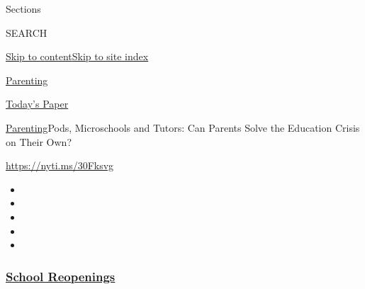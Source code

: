 Sections

SEARCH

\protect\hyperlink{site-content}{Skip to
content}\protect\hyperlink{site-index}{Skip to site index}

\href{https://www.nytimes3xbfgragh.onion/section/parenting}{Parenting}

\href{https://myaccount.nytimes3xbfgragh.onion/auth/login?response_type=cookie\&client_id=vi}{}

\href{https://www.nytimes3xbfgragh.onion/section/todayspaper}{Today's
Paper}

\href{/section/parenting}{Parenting}\textbar{}Pods, Microschools and
Tutors: Can Parents Solve the Education Crisis on Their Own?

\url{https://nyti.ms/30Fksvg}

\begin{itemize}
\item
\item
\item
\item
\item
\end{itemize}

\hypertarget{school-reopenings}{%
\subsubsection{\texorpdfstring{\href{https://www.nytimes3xbfgragh.onion/spotlight/schools-reopening?name=styln-coronavirus-schools-reopening\&region=TOP_BANNER\&block=storyline_menu_recirc\&action=click\&pgtype=Article\&impression_id=ce3b7610-f4b6-11ea-b916-45f6d9eb4786\&variant=undefined}{School
Reopenings}}{School Reopenings}}\label{school-reopenings}}

